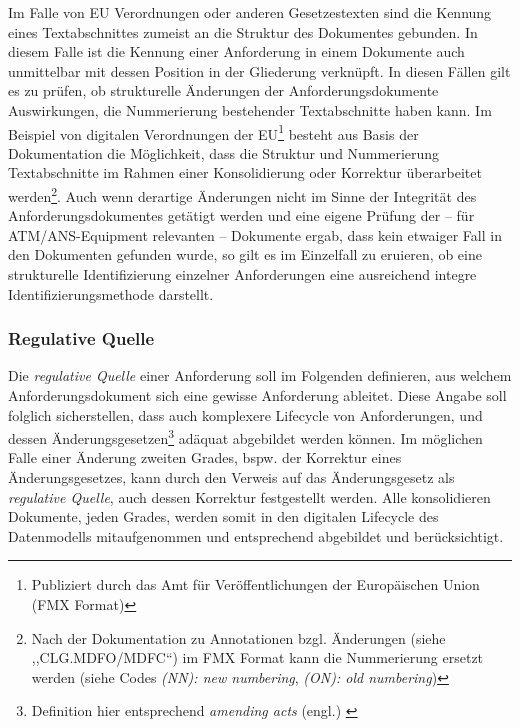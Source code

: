 Im Falle von EU Verordnungen oder anderen Gesetzestexten sind die Kennung eines Textabschnittes zumeist an die Struktur des Dokumentes gebunden. 
In diesem Falle ist die Kennung einer Anforderung in einem Dokumente auch unmittelbar mit dessen Position in der Gliederung verknüpft. 
In diesen Fällen gilt es zu prüfen, ob strukturelle Änderungen der Anforderungsdokumente Auswirkungen, die Nummerierung bestehender Textabschnitte haben kann.
Im Beispiel von digitalen Verordnungen der EU\footnote{Publiziert durch das Amt für Veröffentlichungen der Europäischen Union (FMX Format)} besteht aus Basis der Dokumentation die Möglichkeit, dass die Struktur und Nummerierung Textabschnitte im Rahmen einer Konsolidierung oder Korrektur überarbeitet werden\footnote{Nach der Dokumentation zu Annotationen bzgl. Änderungen (siehe ,,CLG.MDFO/MDFC``) im FMX Format kann die Nummerierung ersetzt werden (siehe Codes \textit{(NN): new numbering}, \textit{(ON): old numbering})\cite{eu_fmx4_proc}}. 
Auch wenn derartige Änderungen nicht im Sinne der Integrität des Anforderungsdokumentes getätigt werden und eine eigene Prüfung der -- für ATM/ANS-Equipment relevanten -- Dokumente ergab, dass kein etwaiger Fall in den Dokumenten gefunden wurde, so gilt es im Einzelfall zu eruieren, ob eine strukturelle Identifizierung einzelner Anforderungen eine ausreichend integre Identifizierungsmethode darstellt. 


\subsubsection{Regulative Quelle}

Die \textit{regulative Quelle} einer Anforderung soll im Folgenden definieren, aus welchem Anforderungsdokument sich eine gewisse Anforderung ableitet. 
Diese Angabe soll folglich sicherstellen, dass auch komplexere Lifecycle von Anforderungen, und dessen Änderungsgesetzen\footnote{Definition hier entsprechend  \textit{amending acts} (engl.) \cite{eu_consolidation}} adäquat abgebildet werden können.
Im möglichen Falle einer Änderung zweiten Grades, bspw. der Korrektur eines Änderungsgesetzes, kann durch den Verweis auf das Änderungsgesetz als \textit{regulative Quelle}, auch dessen Korrektur festgestellt werden. 
Alle konsolidieren Dokumente, jeden Grades, werden somit in den digitalen Lifecycle des Datenmodells mitaufgenommen und entsprechend abgebildet und berücksichtigt.  

